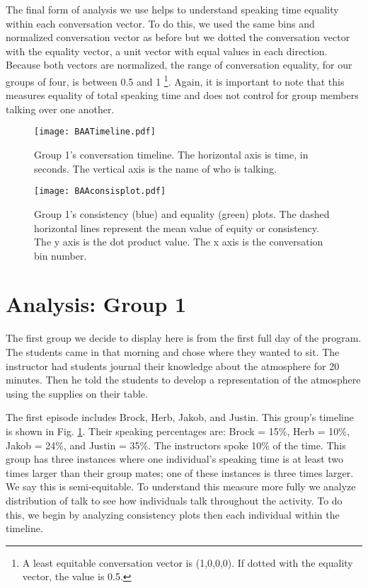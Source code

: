\documentclass[aps,pra,reprint,noshowpacs,superscriptaddress, nofootinbib]{revtex4-1}
\begin{document}
   The final form of analysis we use helps to understand speaking time equality within each conversation vector. To do this, we used the same bins and normalized conversation vector as before but we dotted the conversation vector with the equality vector, a unit vector with equal values in each direction. Because both vectors are normalized, the range of conversation equality, for our groups of four, is between 0.5 and 1 \footnote{A least equitable conversation vector is (1,0,0,0). If dotted with the equality vector, the value is 0.5.}. Again, it is important to note that this measures equality of total speaking time and does not control for group members talking over one another.

\begin{figure}
\centering
\texttt{[image: BAATimeline.pdf]}
\caption{Group 1's conversation timeline. The horizontal axis is time, in seconds. The vertical axis is the name of who is talking. \label{fig1}}
\end{figure}

\begin{figure}
\texttt{[image: BAAconsisplot.pdf]}
\caption{Group 1's consistency (blue) and equality (green) plots. The dashed horizontal lines represent the mean value of equity or consistency. The y axis is the dot product value. The x axis is the conversation bin number.\label{fig2}}
\end{figure}

\section{Analysis: Group 1}
   The first group we decide to display here is from the first full day of the program. The students came in that morning and chose where they wanted to sit. The instructor had students journal their knowledge about the atmosphere for 20 minutes. Then he told the students to develop a representation of the atmosphere using the supplies on their table. 
   
   The first episode includes Brock, Herb, Jakob, and Justin. This group's timeline is shown in Fig. \ref{fig1}. Their speaking percentages are: Brock = 15\%, Herb = 10\%, Jakob = 24\%, and Justin = 35\%. The instructors spoke 10\% of the time. This group has three instances where one individual's speaking time is at least two times larger than their group mates; one of these instances is three times larger. We say this is semi-equitable. To understand this measure more fully we analyze distribution of talk to see how individuals talk throughout the activity. To do this, we begin by analyzing consistency plots then each individual within the timeline.
\end{document}
